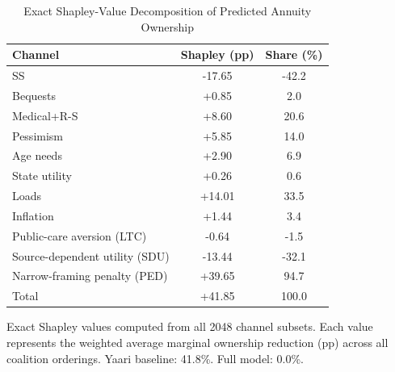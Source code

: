 \begin{table}[htbp]
\centering
\caption{Exact Shapley-Value Decomposition of Predicted Annuity Ownership}
\label{tab:shapley_exact}
\begin{tabular}{lcc}
\toprule
Channel & Shapley (pp) & Share (\%) \\
\midrule
SS & -17.65 & -42.2 \\
Bequests & +0.85 & 2.0 \\
Medical+R-S & +8.60 & 20.6 \\
Pessimism & +5.85 & 14.0 \\
Age needs & +2.90 & 6.9 \\
State utility & +0.26 & 0.6 \\
Loads & +14.01 & 33.5 \\
Inflation & +1.44 & 3.4 \\
Public-care aversion (LTC) & -0.64 & -1.5 \\
Source-dependent utility (SDU) & -13.44 & -32.1 \\
Narrow-framing penalty (PED) & +39.65 & 94.7 \\
\midrule
Total & +41.85 & 100.0 \\
\bottomrule
\end{tabular}
\begin{tablenotes}
\small
\item Exact Shapley values computed from all 2048 channel subsets.
Each value represents the weighted average marginal ownership reduction (pp)
across all coalition orderings.
Yaari baseline: 41.8\%. Full model: 0.0\%.
\end{tablenotes}
\end{table}
